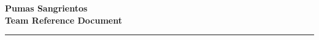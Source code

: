 \documentclass[10pt,landscape,twocolumn]{article}
\begin{document}
\begin{center}
    \LARGE \textbf{Pumas Sangrientos} \\
    \large \textbf{Team Reference Document}
\end{center}

\tableofcontents
\vspace{0.1cm}
\hrule
\vspace{0.2cm}





\end{document}
